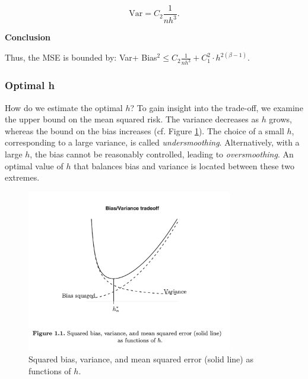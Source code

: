 \documentclass{article}
\begin{document}
\[
\text{Var} = C_2 \frac{1}{n h^3}.
\]


\textbf{Conclusion}

Thus, the MSE is bounded by: Var+ Bias\(^{2}\leq C_{2}\frac{1}{nh^{3}} +C_1^{2} \cdot h^{2(\beta - 1)}\). \\ 

\subsubsection{Optimal h}


How do we estimate the optimal $h$? To gain insight into the trade-off, we examine the upper bound on the mean squared risk. The variance decreases as $h$ grows, whereas the bound on the bias increases (cf. Figure \ref{fig:tradeoff}). The choice of a small $h$, corresponding to a large variance, is called \textit{undersmoothing}. Alternatively, with a large $h$, the bias cannot be reasonably controlled, leading to \textit{oversmoothing}. An optimal value of $h$ that balances bias and variance is located between these two extremes.

\begin{figure}[h]
    \centering
    \includegraphics[width=0.8\textwidth]{trade_off_nonparametrics.png} %
    \caption{Squared bias, variance, and mean squared error (solid line) as functions of $h$.}
    \label{fig:tradeoff}
\end{figure}
\end{document}
